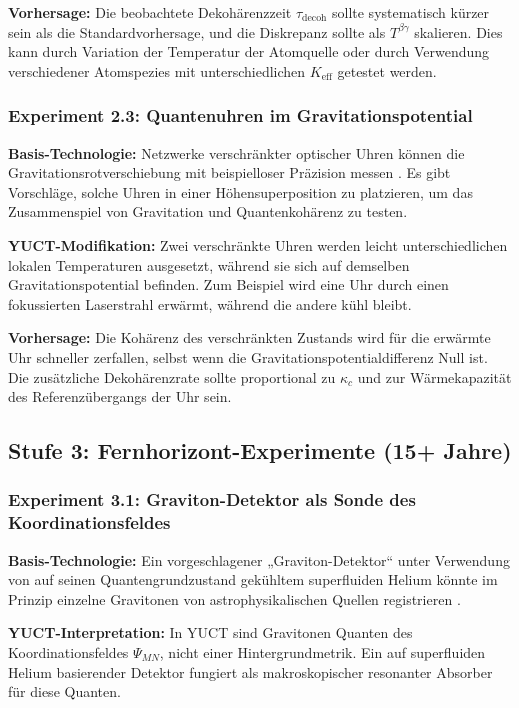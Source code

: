 \documentclass[12pt]{article}
\theoremstyle{remark}
\newcommand{\Keff}{K_{\mathrm{eff}}}
\begin{document}
	\textbf{Vorhersage:} Die beobachtete Dekohärenzzeit \(\tau_{\mathrm{decoh}}\) sollte systematisch kürzer sein als die Standardvorhersage, und die Diskrepanz sollte als \(T^{\beta\gamma}\) skalieren. Dies kann durch Variation der Temperatur der Atomquelle oder durch Verwendung verschiedener Atomspezies mit unterschiedlichen \(\Keff\) getestet werden.
	
	\subsubsection{Experiment 2.3: Quantenuhren im Gravitationspotential}
	
	\textbf{Basis-Technologie:} Netzwerke verschränkter optischer Uhren können die Gravitationsrotverschiebung mit beispielloser Präzision messen \cite{Katori2021}. Es gibt Vorschläge, solche Uhren in einer Höhensuperposition zu platzieren, um das Zusammenspiel von Gravitation und Quantenkohärenz zu testen.
	
	\textbf{YUCT-Modifikation:} Zwei verschränkte Uhren werden leicht unterschiedlichen lokalen Temperaturen ausgesetzt, während sie sich auf demselben Gravitationspotential befinden. Zum Beispiel wird eine Uhr durch einen fokussierten Laserstrahl erwärmt, während die andere kühl bleibt.
	
	\textbf{Vorhersage:} Die Kohärenz des verschränkten Zustands wird für die erwärmte Uhr schneller zerfallen, selbst wenn die Gravitationspotentialdifferenz Null ist. Die zusätzliche Dekohärenzrate sollte proportional zu \(\kappa_c\) und zur Wärmekapazität des Referenzübergangs der Uhr sein.
	
	\subsection{Stufe 3: Fernhorizont-Experimente (15+ Jahre)}
	\label{subsec:far-tests}
	
	\subsubsection{Experiment 3.1: Graviton-Detektor als Sonde des Koordinationsfeldes}
	
	\textbf{Basis-Technologie:} Ein vorgeschlagener „Graviton-Detektor“ unter Verwendung von auf seinen Quantengrundzustand gekühltem superfluiden Helium könnte im Prinzip einzelne Gravitonen von astrophysikalischen Quellen registrieren \cite{Berezin2025}.
	
	\textbf{YUCT-Interpretation:} In YUCT sind Gravitonen Quanten des Koordinationsfeldes \(\Psi_{MN}\), nicht einer Hintergrundmetrik. Ein auf superfluiden Helium basierender Detektor fungiert als makroskopischer resonanter Absorber für diese Quanten.
	
\end{document}
